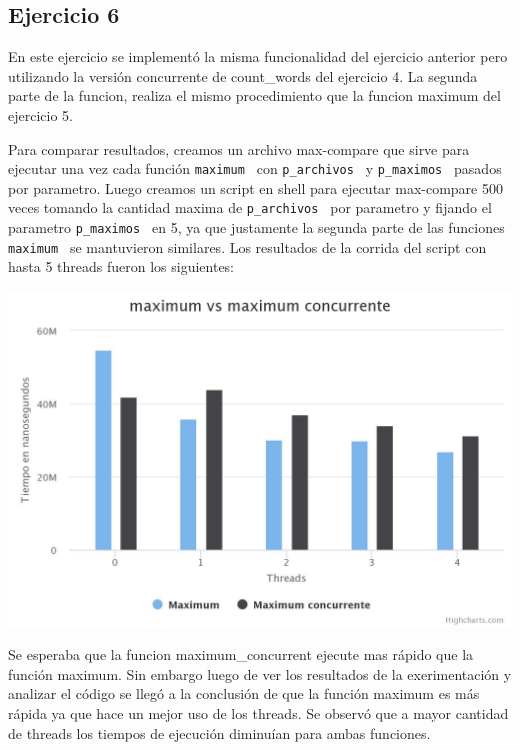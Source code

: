 \documentclass[a4paper]{article}
\begin{document}
{\subsection{Ejercicio 6}

En este ejercicio se implementó la misma funcionalidad del ejercicio anterior pero utilizando la versión concurrente de count_words del ejercicio 4. La segunda parte de la funcion, realiza el mismo procedimiento que la funcion maximum del ejercicio 5.

Para comparar resultados, creamos un archivo max-compare que sirve para ejecutar una vez cada función {\tt maximum } con {\tt p_archivos } y {\tt p_maximos } pasados por parametro. Luego creamos un script en shell para ejecutar max-compare 500 veces tomando la cantidad maxima de {\tt p_archivos } por parametro y fijando el parametro {\tt p_maximos } en 5, ya que justamente la segunda parte de las funciones {\tt maximum } se mantuvieron similares. Los resultados de la corrida del script con hasta 5 threads fueron los siguientes:

\includegraphics[scale=0.35]{imagenes/chart.jpeg}

Se esperaba que la funcion maximum_concurrent ejecute mas rápido que la función maximum. Sin embargo luego de ver los resultados de la exerimentación y analizar el código se llegó a la conclusión de que la función maximum es más rápida ya que hace un mejor uso de los threads. Se observó que a mayor cantidad de threads los tiempos de ejecución diminuían para ambas funciones.


}
\end{document}
